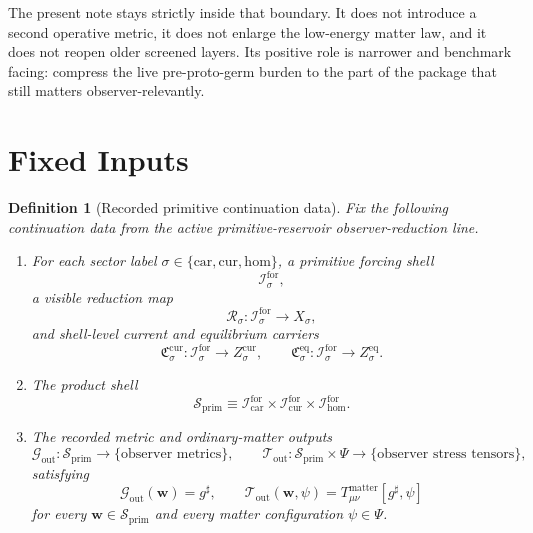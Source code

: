 \documentclass[11pt]{article}
\newcommand{\CompletedMetric}{g^{\sharp}}
\newcommand{\MatterSpace}{\Psi}
\newcommand{\Car}{\mathrm{car}}
\newcommand{\Cur}{\mathrm{cur}}
\newcommand{\Hom}{\mathrm{hom}}
\newcommand{\ForSpace}[1]{\mathcal I_{#1}^{\mathrm{for}}}
\newcommand{\PrimShell}{\mathcal S_{\mathrm{prim}}}
\newcommand{\Reduction}[1]{\mathcal R_{#1}}
\newcommand{\CurrentCarrier}[1]{\mathfrak C_{#1}^{\mathrm{cur}}}
\newcommand{\EqCarrier}[1]{\mathfrak C_{#1}^{\mathrm{eq}}}
\newcommand{\MetricOut}{\mathscr G_{\mathrm{out}}}
\newcommand{\MatterOut}{\mathscr T_{\mathrm{out}}}
\newtheorem{definition}{Definition}
\begin{document}
The present note stays strictly inside that boundary. It does not introduce a second operative metric, it does not enlarge the low-energy matter law, and it does not reopen older screened layers. Its positive role is narrower and benchmark facing: compress the live pre-proto-germ burden to the part of the package that still matters observer-relevantly.

\section{Fixed Inputs}

\begin{definition}[Recorded primitive continuation data]
\label{def:fixed}
Fix the following continuation data from the active primitive-reservoir observer-reduction line.
\begin{enumerate}
    \item For each sector label \(\sigma\in\{\Car,\Cur,\Hom\}\), a primitive forcing shell
    \[
    \ForSpace{\sigma},
    \]
    a visible reduction map
    \[
    \Reduction{\sigma}:\ForSpace{\sigma}\to X_{\sigma},
    \]
    and shell-level current and equilibrium carriers
    \[
    \CurrentCarrier{\sigma}:\ForSpace{\sigma}\to Z_{\sigma}^{\mathrm{cur}},
    \qquad
    \EqCarrier{\sigma}:\ForSpace{\sigma}\to Z_{\sigma}^{\mathrm{eq}}.
    \]
    \item The product shell
    \[
    \PrimShell
    \equiv
    \ForSpace{\Car}\times \ForSpace{\Cur}\times \ForSpace{\Hom}.
    \]
    \item The recorded metric and ordinary-matter outputs
    \[
    \MetricOut:\PrimShell\to\{\text{observer metrics}\},
    \qquad
    \MatterOut:\PrimShell\times\MatterSpace\to\{\text{observer stress tensors}\},
    \]
    satisfying
    \begin{equation}
    \MetricOut(\mathbf w)=\CompletedMetric,
    \qquad
    \MatterOut(\mathbf w,\psi)
    =
    T_{\mu\nu}^{\mathrm{matter}}[\CompletedMetric,\psi]
    \label{eq:fixedoutputs}
    \end{equation}
    for every \(\mathbf w\in\PrimShell\) and every matter configuration \(\psi\in\MatterSpace\).
\end{enumerate}
\end{definition}
\end{document}
